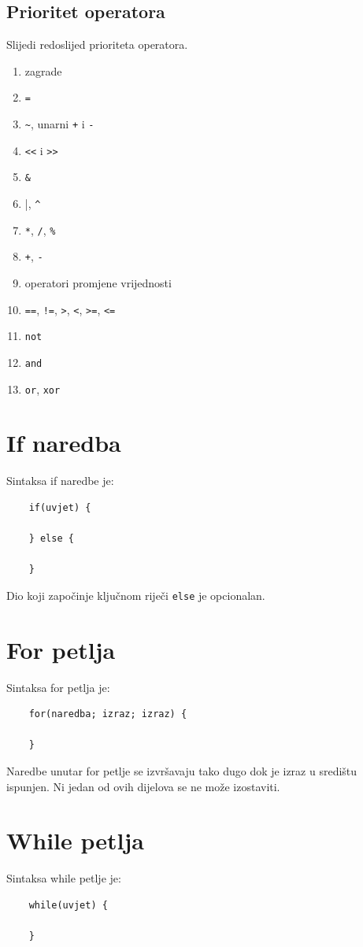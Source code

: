 \documentclass[times, utf8, zavrsni]{fer}
\begin{document}
\subsection{Prioritet operatora}
Slijedi redoslijed prioriteta operatora.

\begin{enumerate} [noitemsep]
    \item zagrade
    \item \verb|=|
    \item \verb|~|, unarni \verb|+| i \verb|-|
    \item \verb|<<| i \verb|>>|
    \item \verb|&|
    \item \verb|||, \verb|^|
    \item \verb|*|, \verb|/|, \verb|%|
    \item \verb|+|, \verb|-|
    \item operatori promjene vrijednosti
    \item \verb|==|, \verb|!=|, \verb|>|, \verb|<|, \verb|>=|, \verb|<=|
    \item \verb|not|
    \item \verb|and|
    \item \verb|or|, \verb|xor|
\end{enumerate}

\section{If naredba}
Sintaksa if naredbe je: 
\begin{verbatim}
    if(uvjet) {

    } else {

    }
\end{verbatim}

Dio koji započinje ključnom riječi \verb|else| je opcionalan.

\section{For petlja}
Sintaksa for petlja je: 
\begin{verbatim}
    for(naredba; izraz; izraz) {

    }
\end{verbatim}
Naredbe unutar for petlje se izvršavaju tako dugo dok je izraz u središtu ispunjen. Ni jedan od ovih dijelova se ne može izostaviti.

\section{While petlja}
Sintaksa while petlje je:
\begin{verbatim}
    while(uvjet) {

    }
\end{verbatim}
\end{document}
